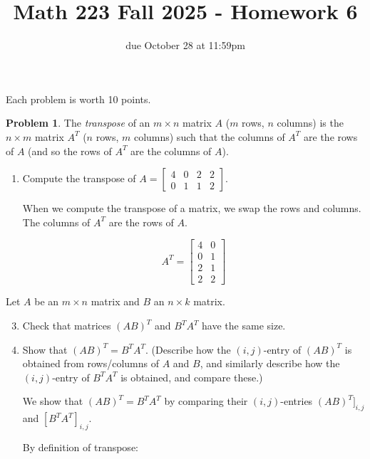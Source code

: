 \documentclass[12pt, oneside]{amsart}
\title{Math 223 Fall 2025 - Homework 6}
\author{due October 28 at 11:59pm}
\theoremstyle{definition}
\newtheorem{prob}{Problem}
\begin{document}
\maketitle
Each problem is worth 10 points.

\begin{prob}
    The \emph{transpose} of an $m\times n$ matrix $A$ ($m$ rows, $n$ columns) is the $n\times m$ matrix $A^T$ ($n$ rows, $m$ columns) such that the columns of $A^T$ are the rows of $A$ (and so the rows of $A^T$ are the columns of $A$).

    \begin{enumerate}
        \item Compute the transpose of $A = \left[\begin{matrix}
        4 & 0 & 2 & 2 \\
        0 & 1 & 1 & 2
        \end{matrix}\right]$.
        
        \begin{solution}
        When we compute the transpose of a matrix, we swap the rows and columns. The columns of $A^T$ are the rows of $A$.
        
        \[
        A^T = \begin{bmatrix}
        4 & 0 \\
        0 & 1 \\
        2 & 1 \\
        2 & 2
        \end{bmatrix}
        \]
        \end{solution}
    \end{enumerate}
    Let $A$ be an $m\times n$ matrix and $B$ an $n\times k$ matrix.
    \begin{enumerate}
    \setcounter{enumi}{2}
    \item Check that matrices $(AB)^T$ and $B^T A^T$ have the same size.
    \item Show that $(AB)^T = B^T A^T$. 
    (Describe how the $(i,j)$-entry of $(AB)^T$ is obtained from rows/columns of $A$ and $B$, and similarly describe how the $(i,j)$-entry of $B^T A^T$ is obtained, and compare these.)
    
    \begin{solution}
    We show that $(AB)^T = B^T A^T$ by comparing their $(i,j)$-entries $(AB)^T]_{i,j}$ and $[B^T A^T]_{i,j}$.
    
    \vspace{0.3cm}
    
    By definition of transpose:
    

\end{solution}
\end{enumerate}
\end{prob}
\end{document}
